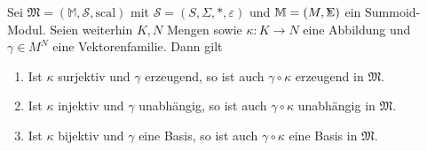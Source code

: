 \documentclass{article}
\DeclareMathOperator*{\Sigmacirc}{%
  \ThisStyle{\mathop{\ensurestackMath{\stackinset{c}{-0.75\LMpt}{c}{}{%
  \rotatebox[origin=lb]{-90}{$\circ$}}{\SavedStyle\Sigma}}}}}
\begin{document}
\begin{theorem}
  Sei $\mathfrak{M} = (\mathbb{M}, \mathcal{S}, \text{scal})$ 
  mit $\mathcal{S} = (S, \Sigma, \ast, \varepsilon)$
  und $\mathbb{M} = (M, \Sigmacirc)$ ein Summoid-Modul.
  Seien weiterhin $K, N$ Mengen sowie $\kappa \colon K \to N$ eine Abbildung und $\gamma \in M^N$ eine Vektorenfamilie.
  Dann gilt
  \begin{enumerate}
    \item Ist $\kappa$ surjektiv und $\gamma$ erzeugend, so ist auch $\gamma \circ \kappa$ erzeugend in $\mathfrak{M}$.
    \item Ist $\kappa$ injektiv und $\gamma$ unabhängig, so ist auch $\gamma \circ \kappa$ unabhängig in $\mathfrak{M}$.
    \item Ist $\kappa$ bijektiv und $\gamma$ eine Basis, so ist auch $\gamma \circ \kappa$ eine Basis in $\mathfrak{M}$.
  \end{enumerate}
\end{theorem}
\end{document}
